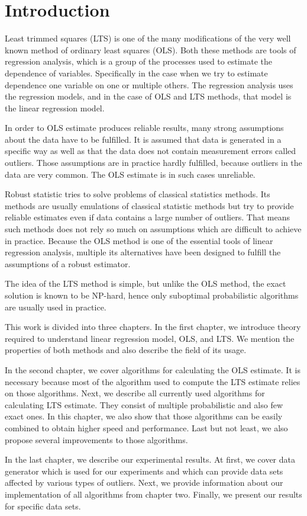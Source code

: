 \chapter{Introduction}
Least trimmed squares (LTS) is one of the many modifications of the very well known method of ordinary least squares (OLS). Both these methods are tools of regression analysis, which is a group of the processes used to estimate the dependence of variables. Specifically in the case when we try to estimate dependence one variable on one or multiple others. The regression analysis uses the regression models, and in the case of OLS and LTS methods, that model is the linear regression model.

In order to OLS estimate produces reliable results, many strong assumptions about the data have to be fulfilled. It is assumed that data is generated in a specific way as well as that the data does not contain measurement errors called outliers. Those assumptions are in practice hardly fulfilled, because outliers in the data are very common. The OLS estimate is in such cases unreliable.

Robust statistic tries to solve problems of classical statistics methods. Its methods are usually emulations of classical statistic methods but try to provide reliable estimates even if data contains a large number of outliers. That means such methods does not rely so much on assumptions which are difficult to achieve in practice. Because the OLS method is one of the essential tools of linear regression analysis, multiple its alternatives have been designed to fulfill the assumptions of a robust estimator.

The idea of the LTS method is simple, but unlike the OLS method, the exact solution is known to be NP-hard, hence only suboptimal probabilistic algorithms are usually used in practice.

This work is divided into three chapters. In the first chapter, we introduce theory required to understand linear regression model, OLS, and LTS. We mention the properties of both methods and also describe the field of its usage.

In the second chapter, we cover algorithms for calculating the OLS estimate. It is necessary because most of the algorithm used to compute the LTS estimate relies on those algorithms. Next, we describe all currently used algorithms for calculating LTS estimate. They consist of multiple probabilistic and also few exact ones. In this chapter, we also show that those algorithms can be easily combined to obtain higher speed and performance. Last but not least, we also propose several improvements to those algorithms.

In the last chapter, we describe our experimental results. At first, we cover data generator which is used for our experiments and which can provide data sets affected by various types of outliers. Next, we provide information about our implementation of all algorithms from chapter two. Finally, we present our results for specific data sets.